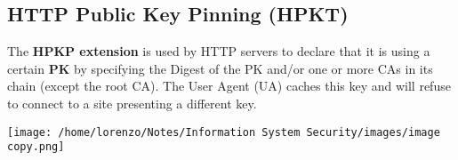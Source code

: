 \subsection{HTTP Public Key Pinning (HPKT)}
\begin{minipage}{0.7\textwidth}
The \textbf{HPKP extension} is used by HTTP servers to declare that it is using a certain \textbf{PK} by specifying the Digest of the PK and/or one or more CAs in its chain (except the root CA). The User Agent (UA) caches this key and will refuse to connect to a site presenting a different key. 
\end{minipage} 
\hspace{0.3cm}
\begin{minipage}{0.3\textwidth}
    \centering
    \texttt{[image: /home/lorenzo/Notes/Information System Security/images/image copy.png]}
\end{minipage}

